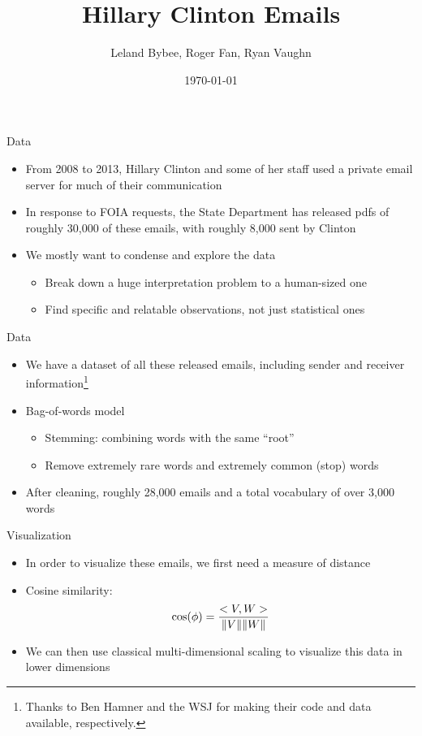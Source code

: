 \documentclass[handout,13pt]{beamer}
\title[601 Final Project]{Hillary Clinton Emails}
\author[Leland Bybee, Roger Fan, Ryan Vaughn]{Leland Bybee, Roger Fan, Ryan Vaughn}
\date{\today}
\DeclarePairedDelimiter{\norm}{\lVert}{\rVert}
\begin{document}
\begin{frame}
\maketitle
\end{frame}


\begin{frame}{Data}
\begin{itemize}
\item From 2008 to 2013, Hillary Clinton and some of her staff used a private email server for much of their communication
\item In response to FOIA requests, the State Department has released pdfs of roughly 30,000 of these emails, with roughly 8,000 sent by Clinton
\item We mostly want to condense and explore the data
  \begin{itemize}
  \item Break down a huge interpretation problem to a human-sized one
  \item Find specific and relatable observations, not just statistical ones
  \end{itemize}
\end{itemize}
\end{frame}


\begin{frame}{Data}
\begin{itemize}
\item We have a dataset of all these released emails, including sender and receiver information\footnote{Thanks to Ben Hamner and the WSJ for making their code and data available, respectively.}
\pause\item Bag-of-words model
  \begin{itemize}
  \item Stemming: combining words with the same ``root''
  \item Remove extremely rare words and extremely common (stop) words
  \end{itemize}
\item After cleaning, roughly 28,000 emails and a total vocabulary of over 3,000 words
\end{itemize}
\end{frame}


\begin{frame}{Visualization}
\begin{itemize}
\item In order to visualize these emails, we first need a measure of distance
\item Cosine similarity:
  \begin{equation*}
  \cos(\phi) = \frac{<V, W>}{\norm{V}\norm{W}}
  \end{equation*}
\item We can then use classical multi-dimensional scaling to visualize this data in lower dimensions
\end{itemize}
\end{frame}
\end{document}
